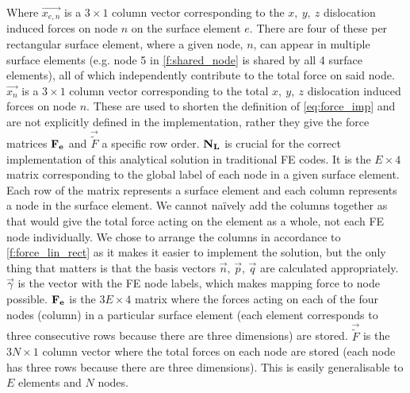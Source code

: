 \documentclass[11pt]{iopart}
\begin{document}
Where $\vec{x_{e,n}}$ is a $3\times1$ column vector corresponding to the $x,~y,~z$ dislocation induced forces on node $n$ on the surface element $e$. There are four of these per rectangular surface element, where a given node, $n$, can appear in multiple surface elements (e.g. node 5 in \cref{f:shared_node} is shared by all 4 surface elements), all of which independently contribute to the total force on said node. $\vec{x_n}$ is a $3\times1$ column vector corresponding to the total $x,~y,~z$ dislocation induced forces on node $n$. These are used to shorten the definition of \cref{eq:force_imp} and are not explicitly defined in the implementation, rather they give the force matrices $\mathbf{F_{e}}$ and $\vec{\tilde{F}}$ a specific row order. $\mathbf{N_{L}}$ is crucial for the correct implementation of this analytical solution in traditional FE codes. It is the $E\times4$ matrix corresponding to the global label of each node in a given surface element. Each row of the matrix represents a surface element and each column represents a node in the surface element. We cannot na\"ively add the columns together as that would give the total force acting on the element as a whole, not each FE node individually. We chose to arrange the columns in accordance to \cref{f:force_lin_rect} as it makes it easier to implement the solution, but the only thing that matters is that the basis vectors $\vec{n},\,\vec{p},\,\vec{q}$ are calculated appropriately. $\vec{\gamma}$ is the vector with the FE node labels, which makes mapping force to node possible. $\mathbf{F_{e}}$ is the $3E \times 4$ matrix where the forces acting on each of the four nodes (column) in a particular surface element (each element corresponds to three consecutive rows because there are three dimensions) are stored. $\vec{\tilde{F}}$ is the $3N\times1$ column vector where the total forces on each node are stored (each node has three rows because there are three dimensions). This is easily generalisable to $E$ elements and $N$ nodes.
\end{document}
